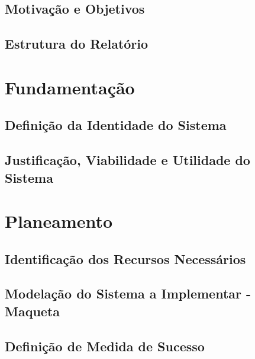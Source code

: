 \documentclass[a4paper]{report}
\begin{document}
    \section{Motivação e Objetivos}
    \section{Estrutura do Relatório}

\chapter{Fundamentação}
    \section{Definição da Identidade do Sistema}
    \section{Justificação, Viabilidade e Utilidade do Sistema}

\chapter{Planeamento}
    \section{Identificação dos Recursos Necessários}
    \section{Modelação do Sistema a Implementar - Maqueta}
    \section{Definição de Medida de Sucesso}
\end{document}
